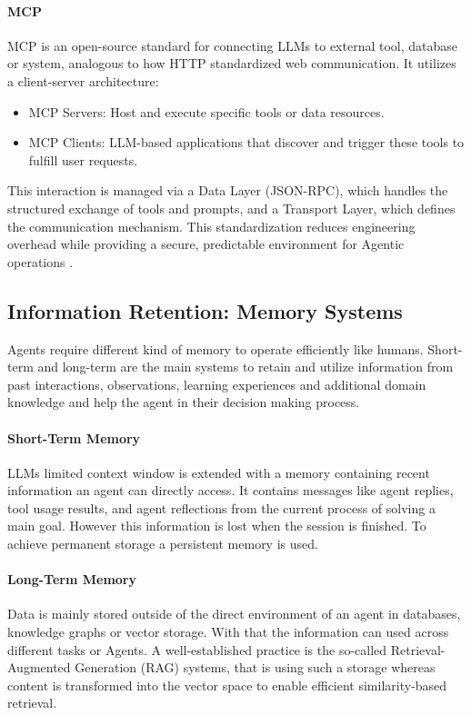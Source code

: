 \documentclass[10pt,twocolumn,letterpaper]{article}
\begin{document}
\paragraph{MCP}
MCP is an open-source standard for connecting LLMs to external tool, database or system, analogous to how HTTP standardized web communication. It utilizes a client-server architecture:

\begin{itemize}
    \item MCP Servers: Host and execute specific tools or data resources.
    \item MCP Clients: LLM-based applications that discover and trigger these tools to fulfill user requests.
\end{itemize}

This interaction is managed via a Data Layer (JSON-RPC), which handles the structured exchange of tools and prompts, and a Transport Layer, which defines the communication mechanism. This standardization reduces engineering overhead while providing a secure, predictable environment for Agentic operations \citep{mcp2026}. 

\subsection{Information Retention: Memory Systems}
Agents require different kind of memory to operate efficiently like humans. Short-term and long-term are the main systems to retain and utilize information from past interactions, observations, learning experiences and additional domain knowledge and help the agent in their decision making process.
\paragraph{Short-Term Memory} 
LLMs limited context window is extended with a memory containing recent information an agent can directly access. It contains messages like agent replies, tool usage results, and agent reflections from the current process of solving a main goal. However this information is lost when the session is finished. To achieve permanent storage a persistent memory is used.
\paragraph{Long-Term Memory}
Data is mainly stored outside of the direct environment of an agent in databases, knowledge graphs or vector storage. With that the information can used across different tasks or Agents. A well-established practice is the so-called Retrieval-Augmented Generation (RAG) systems, that is using such a storage whereas content is transformed into the vector space to enable efficient similarity-based retrieval. 
\end{document}
